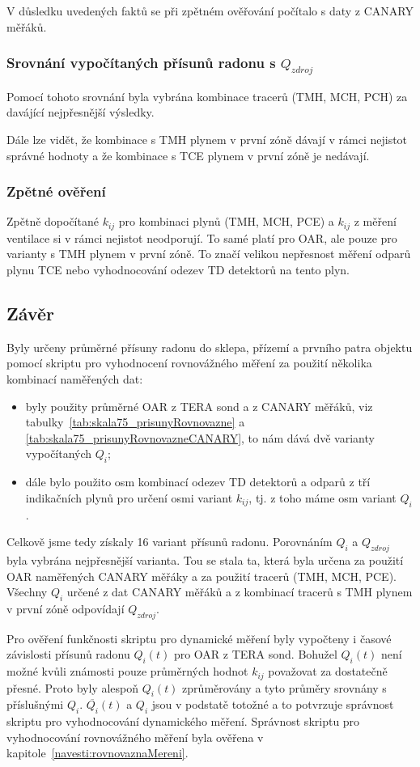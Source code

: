 V důsledku uvedených faktů se při zpětném ověřování počítalo s daty z CANARY měřáků.

\subsubsection{Srovnání vypočítaných přísunů radonu s $Q_{zdroj}$}
Pomocí tohoto srovnání byla vybrána kombinace tracerů (TMH, MCH, PCH) za davájící nejpřesnější výsledky. 

Dále lze vidět, že kombinace s TMH plynem v první zóně dávají v rámci nejistot správné hodnoty a že kombinace s TCE plynem v první zóně je nedávají.

\subsubsection{Zpětné ověření}
Zpětně dopočítané $k_{ij}$ pro kombinaci plynů (TMH, MCH, PCE) a $k_{ij}$ z měření ventilace si v rámci nejistot neodporují. To samé platí pro OAR, ale pouze pro varianty s TMH plynem v první zóně. To značí velikou nepřesnost měření odparů plynu TCE nebo vyhodnocování odezev TD detektorů na tento plyn.

\subsection{Závěr}
Byly určeny průměrné přísuny radonu do sklepa, přízemí a prvního patra objektu pomocí skriptu pro vyhodnocení rovnovážného měření za použití několika kombinací naměřených dat:
\begin{itemize}
    \item byly použity průměrné OAR z TERA sond a z CANARY měřáků, viz tabulky~\ref{tab:skala75_prisunyRovnovazne} a \ref{tab:skala75_prisunyRovnovazneCANARY}, to nám dává dvě varianty vypočítaných $Q_i$;
    \item dále bylo použito osm kombinací odezev TD detektorů a odparů z tří indikačních plynů pro určení osmi variant $k_{ij}$, tj. z toho máme osm variant $Q_i$.
\end{itemize}
Celkově jsme tedy získaly 16 variant přísunů radonu. Porovnáním $Q_i$ a $Q_{zdroj}$ byla vybrána nejpřesnější varianta. Tou se stala ta, která byla určena za použití OAR naměřených CANARY měřáky a za použití tracerů (TMH, MCH, PCE). Všechny $Q_i$ určené z dat CANARY měřáků a z kombinací tracerů s TMH plynem v první zóně odpovídají $Q_{zdroj}$.

Pro ověření funkčnosti skriptu pro dynamické měření byly vypočteny i časové závislosti přísunů radonu $Q_i(t)$ pro OAR z TERA sond. Bohužel $Q_i(t)$ není možné kvůli známosti pouze průměrných hodnot $k_{ij}$ považovat za dostatečně přesné. Proto byly alespoň $Q_i(t)$ zprůměrovány a tyto průměry srovnány s příslušnými $Q_i$. $\overline{Q_i}(t)$ a $Q_i$ jsou v podstatě totožné a to potvrzuje správnost skriptu pro vyhodnocování dynamického měření. Správnost skriptu pro vyhodnocování rovnovážného měření byla ověřena v kapitole~\ref{navesti:rovnovaznaMereni}.

